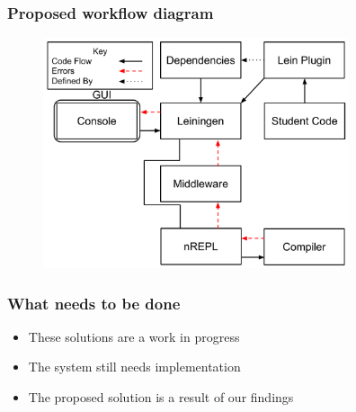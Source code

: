 \documentclass{beamer}
\begin{document}
\begin{frame}[fragile]
\frametitle{Proposed workflow diagram}
\begin{figure}[h]
 \includegraphics[width=9cm]{../OurErrorHandlingSystem.pdf}
 \centering
\end{figure}
\end{frame}

\begin{frame}
\frametitle{What needs to be done}
\begin{itemize}
	\item These solutions are a work in progress
	\item The system still needs implementation
	\item The proposed solution is a result of our findings
\end{itemize}
\end{frame}
\end{document}
